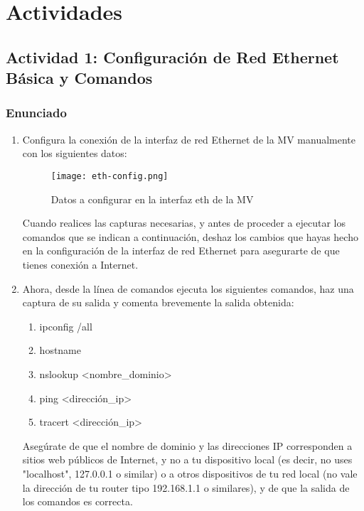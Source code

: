 \section{Actividades}

\subsection{Actividad 1: Configuración de Red Ethernet Básica y Comandos}

\subsubsection{Enunciado}
\begin{enumerate}
    \item Configura la conexión de la interfaz de red Ethernet de la MV manualmente con los siguientes datos:

    \begin{figure}[H]
        \centering
        \texttt{[image: eth-config.png]}
        \caption{Datos a configurar en la interfaz eth de la MV}
    \end{figure}

    Cuando realices las capturas necesarias, y antes de proceder a ejecutar los comandos que se indican a continuación, deshaz los cambios que hayas hecho en la configuración de la interfaz de red Ethernet para asegurarte de que tienes conexión a Internet.

    \item Ahora, desde la línea de comandos ejecuta los siguientes comandos, haz una captura de su salida y comenta brevemente la salida obtenida:

    \begin{enumerate}
        \item ipconfig /all
        \item hostname
        \item nslookup <nombre\_dominio>
        \item ping <dirección\_ip>
        \item tracert <dirección\_ip>
    \end{enumerate}

    Asegúrate de que el nombre de dominio y las direcciones IP corresponden a sitios web públicos de Internet, y no a tu dispositivo local (es decir, no uses "localhost", 127.0.0.1 o similar) o a otros dispositivos de tu red local (no vale la dirección de tu router tipo 192.168.1.1 o similares), y de que la salida de los comandos es correcta.
\end{enumerate}

